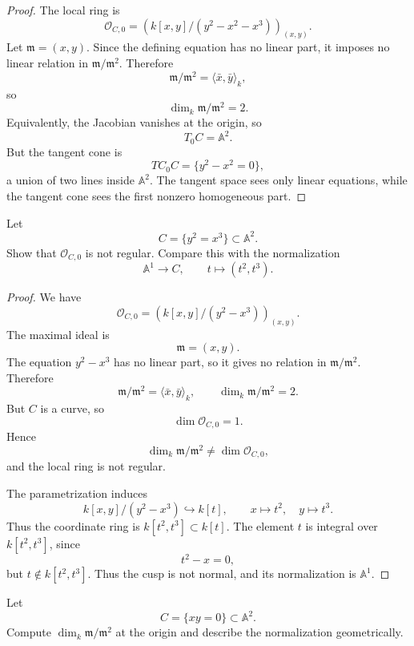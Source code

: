 \begin{proof}
The local ring is
$$
\mathcal{O}_{C,0}
=
\left(k[x,y]/(y^2-x^2-x^3)\right)_{(x,y)}.
$$
Let $\mathfrak m=(x,y)$. Since the defining equation
has no linear part, it imposes no linear relation in
$\mathfrak m/\mathfrak m^2$. Therefore
$$
\mathfrak m/\mathfrak m^2
=\langle \bar x,\bar y\rangle_k,
$$
so
$$
\dim_k\mathfrak m/\mathfrak m^2=2.
$$
Equivalently, the Jacobian vanishes at the origin, so
$$
T_0C=\mathbb{A}^2.
$$
But the tangent cone is
$$
TC_0C=\{y^2-x^2=0\},
$$
a union of two lines inside $\mathbb{A}^2$.
The tangent space sees only linear equations, while the
tangent cone sees the first nonzero homogeneous part.
\end{proof}

\begin{exercise}
\label{exercise-cusp-local-ring-not-regular}
Let
$$
C=\{y^2=x^3\}\subset \mathbb{A}^2.
$$
Show that $\mathcal{O}_{C,0}$ is not regular.
Compare this with the normalization
$$
\mathbb{A}^1\to C,
\qquad
 t\mapsto (t^2,t^3).
$$
\end{exercise}

\begin{proof}
We have
$$
\mathcal{O}_{C,0}
=
\left(k[x,y]/(y^2-x^3)\right)_{(x,y)}.
$$
The maximal ideal is
$$
\mathfrak m=(x,y).
$$
The equation $y^2-x^3$ has no linear part, so it gives
no relation in $\mathfrak m/\mathfrak m^2$. Therefore
$$
\mathfrak m/\mathfrak m^2
=\langle \bar x,\bar y\rangle_k,
\qquad
\dim_k\mathfrak m/\mathfrak m^2=2.
$$
But $C$ is a curve, so
$$
\dim \mathcal{O}_{C,0}=1.
$$
Hence
$$
\dim_k\mathfrak m/\mathfrak m^2
\neq
\dim \mathcal{O}_{C,0},
$$
and the local ring is not regular.

The parametrization induces
$$
k[x,y]/(y^2-x^3)\hookrightarrow k[t],
\qquad
x\mapsto t^2,
\quad
 y\mapsto t^3.
$$
Thus the coordinate ring is $k[t^2,t^3]\subset k[t]$.
The element $t$ is integral over $k[t^2,t^3]$, since
$$
t^2-x=0,
$$
but $t\notin k[t^2,t^3]$. Thus the cusp is not normal,
and its normalization is $\mathbb{A}^1$.
\end{proof}

\begin{exercise}
\label{exercise-node-xy-normalization}
Let
$$
C=\{xy=0\}\subset \mathbb{A}^2.
$$
Compute $\dim_k\mathfrak m/\mathfrak m^2$ at the
origin and describe the normalization geometrically.
\end{exercise}

